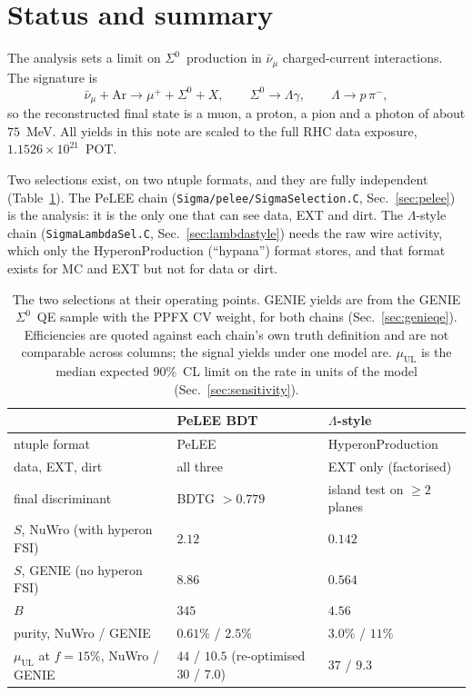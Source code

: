 \documentclass[11pt,a4paper]{article}
\newcommand{\Szero}{\ensuremath{\Sigma^{0}}}
\newcommand{\Lam}{\ensuremath{\Lambda}}
\newcommand{\numubar}{\ensuremath{\bar{\nu}_\mu}}
\newcommand{\muUL}{\ensuremath{\mu_{\mathrm{UL}}}}
\begin{document}
\tableofcontents

\section{Status and summary}
\label{sec:status}

The analysis sets a limit on \Szero\ production in $\numubar$ charged-current
interactions. The signature is
\begin{equation}
  \numubar + \mathrm{Ar} \to \mu^{+} + \Szero + X, \qquad
  \Szero \to \Lam\gamma, \qquad \Lam \to p\,\pi^{-},
\end{equation}
so the reconstructed final state is a muon, a proton, a pion and a photon of about
$75$~MeV. All yields in this note are scaled to the full RHC data exposure,
$1.1526\times10^{21}$~POT.

Two selections exist, on two ntuple formats, and they are fully independent
(Table~\ref{tab:chains}). The PeLEE chain (\texttt{Sigma/pelee/SigmaSelection.C},
Sec.~\ref{sec:pelee}) is the analysis: it is the only one that can see data, EXT and
dirt. The \Lam-style chain (\texttt{SigmaLambdaSel.C}, Sec.~\ref{sec:lambdastyle})
needs the raw wire activity, which only the HyperonProduction (``hypana'') format
stores, and that format exists for MC and EXT but not for data or dirt.

\begin{table}[h]\centering
\caption{The two selections at their operating points. GENIE yields are from the
GENIE \Szero\ QE sample with the PPFX CV weight, for both chains (Sec.~\ref{sec:genieqe}). Efficiencies are
quoted against each chain's own truth definition and are not comparable across
columns; the signal yields under one model are. $\muUL$ is the median expected 90\%~CL
limit on the rate in units of the model (Sec.~\ref{sec:sensitivity}).}
\label{tab:chains}
\small
\begin{tabular}{lll}
\toprule
 & PeLEE BDT & \Lam-style \\
\midrule
ntuple format & PeLEE & HyperonProduction \\
data, EXT, dirt & all three & EXT only (factorised) \\
final discriminant & BDTG $>0.779$ & island test on $\geq2$ planes \\
$S$, NuWro (with hyperon FSI) & $2.12$ & $0.142$ \\
$S$, GENIE (no hyperon FSI) & $8.86$ & $0.564$ \\
$B$ & $345$ & $4.56$ \\
purity, NuWro / GENIE & $0.61\%$ / $2.5\%$ & $3.0\%$ / $11\%$ \\
$\muUL$ at $f=15\%$, NuWro / GENIE & $44$ / $10.5$ (re-optimised $30$ / $7.0$) & $37$ / $9.3$ \\
\bottomrule
\end{tabular}
\end{table}
\end{document}
